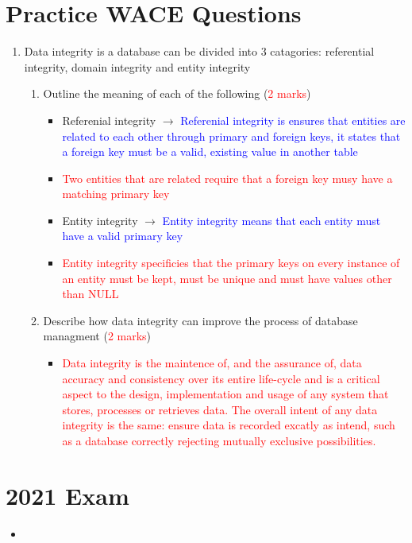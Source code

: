 \documentclass[12pt, a4, twoside]{article}
\begin{document}
\section{Practice WACE Questions}
\begin{center}
  \begin{enumerate}
    \item Data integrity is a database can be divided into 3 catagories: referential integrity, domain integrity and entity integrity
    \begin{enumerate}
      \item Outline the meaning of each of the following (\textcolor{red}{2 marks})
      \begin{itemize}
        \item Referenial integrity $\rightarrow$
        \textcolor{blue}{Referenial integrity is ensures that entities are related to each other through primary and foreign keys, it states that a foreign key must be a valid, existing value in another table}
        \item \textcolor{red}{Two entities that are related require that a foreign key musy have a matching primary key}
        \item Entity integrity $\rightarrow$
        \textcolor{blue}{Entity integrity means that each entity must have a valid primary key}
        \item \textcolor{red}{Entity integrity specificies that the primary keys on every instance of an entity must be kept, must be unique and must have values other than NULL}
      \end{itemize}
      \item Describe how data integrity can improve the process of database managment (\textcolor{red}{2 marks})
      \begin{itemize}
        \item \textcolor{red}{Data integrity is the maintence of, and the assurance of, data accuracy and consistency over its entire life-cycle and is a critical aspect to the design, implementation and usage of any system that stores, processes or retrieves data. The overall intent of any data integrity is the same: ensure data is recorded excatly as intend, such as a database correctly rejecting mutually exclusive possibilities.}
      \end{itemize}
    \end{enumerate}
  \end{enumerate}
\end{center}


\section{2021 Exam} 
\begin{center}

  \begin{itemize}
    \item 
  \end{itemize}
\end{center}
\end{document}
